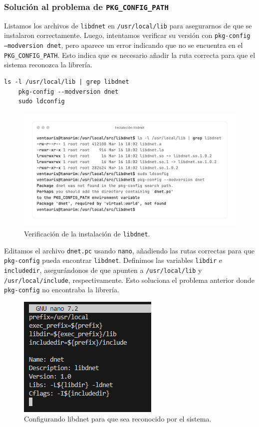 \documentclass[11pt,a4paper,twoside]{report}
\begin{document}
\subsubsection*{Solución al problema de \texttt{PKG\_CONFIG\_PATH}}

Listamos los archivos de \texttt{libdnet} en \texttt{/usr/local/lib} para asegurarnos de que se instalaron correctamente. Luego, intentamos verificar su versión con \texttt{pkg-config --modversion dnet}, pero aparece un error indicando que no se encuentra en el \texttt{PKG\_CONFIG\_PATH}. Esto indica que es necesario añadir la ruta correcta para que el sistema reconozca la librería.

\begin{lstlisting}[style=commandstyle, caption={Listando archivos instalados y verificando libdnet}]
	ls -l /usr/local/lib | grep libdnet
	pkg-config --modversion dnet
	sudo ldconfig
\end{lstlisting}

\begin{figure}[H]
	\centering
	\includegraphics[scale=0.12]{instalacion_snort/6-6.png}
	\caption{Verificación de la instalación de \texttt{libdnet}.}
\end{figure}

Editamos el archivo \texttt{dnet.pc} usando \texttt{nano}, añadiendo las rutas correctas para que \texttt{pkg-config} pueda encontrar \texttt{libdnet}. Definimos las variables \texttt{libdir} e \texttt{includedir}, asegurándonos de que apunten a \texttt{/usr/local/lib} y \texttt{/usr/local/include}, respectivamente. Esto soluciona el problema anterior donde \texttt{pkg-config} no encontraba la librería.

\begin{figure}[H]
	\centering
	\includegraphics[scale=1]{instalacion_snort/7.png}
	\caption{Configurando libdnet para que sea reconocido por el sistema.}
\end{figure}
\end{document}
